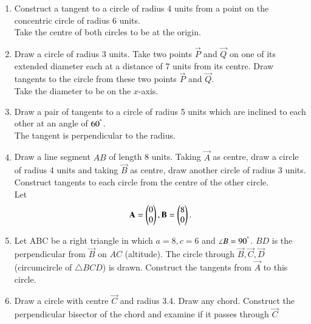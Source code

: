 \documentclass[journal,12pt,twocolumn]{IEEEtran}
\renewcommand\thesection{\arabic{section}}
\begin{document}
\begin{enumerate}[label=\thesection.\arabic*
,ref=\thesection.\theenumi]
\item Construct a tangent to a circle of radius 4 units from a point on the concentric circle of radius 6 
units.
\\
\solution Take the centre of both circles to be at the origin.  
\item Draw a circle of radius 3 units. Take  two points $\vec{P}$ and $\vec{Q}$ on one of its extended 
diameter each at a distance of 7 units from its centre. Draw tangents to the circle from these two points 
$\vec{P}$ and $\vec{Q}$.
\\
\solution Take the diameter to be on the $x$-axis.
\item Draw a pair of tangents to a circle of radius 5 units which are inclined to each other at an angle of 
$60^{\degree}$.
\\
\solution The tangent is perpendicular to the radius.
\item Draw a line segment $AB$ of length 8 units. Taking $\vec{A}$ as centre, draw a circle of radius 4 units 
and taking $\vec{B}$ as centre, draw another circle of radius 3 units. Construct tangents to each circle from 
the centre of the other circle.
\\
\solution Let
\begin{align}
\mathbf{A} = \begin{pmatrix}0 \\ 0\end{pmatrix}, \mathbf{B} = \begin{pmatrix}8 \\ 0\end{pmatrix}.
\end{align}
\item Let ABC be a right triangle in which $a = 8, c = 6$ and $\angle B = 90^{\degree}$.  $BD$ is the 
perpendicular from $\vec{B}$ on $AC$ (altitude). The circle through $\vec{B}, \vec{C}, \vec{D}$ (circumcircle of $\triangle BCD$) is drawn.  Construct the 
tangents from $\vec{A}$ to this circle.

\item Draw a circle with centre $\vec{C}$ and radius 3.4.  Draw any chord.  Construct the perpendicular bisector of the chord and examine if it passes through $\vec{C}$\end{enumerate}
\end{document}
